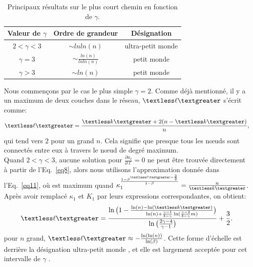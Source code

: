 \begin{table}[h]
\center
\begin{tabular}{|c|c|c|}
\hline
Valeur de $\gamma$ & Ordre de grandeur & Désignation \\
\hline
$2<\gamma<3$ & $\sim lnln(n)$& ultra-petit monde \cite{Cohen-Havlin2003,Do-al2003,Cohen-al2002,Chung-Lu2002,Fox-Bellwood2014,Hofstad-al2014}\\
\hline
$\gamma=3$ &$\sim \frac{ln(n)}{lnln(n)}$ & petit monde  \cite{Bollobas1985,Chung-Lu2002,Fronczak-al2004,Hofstad-al2004,Cohen-Havlin2009}\\
\hline
$\gamma>3$ &$\sim ln(n)$& petit monde \cite{Bollobas1985,Chung-Lu2002,Fronczak-al2004,Hofstad-al2004,Cohen-Havlin2009}\\
\hline
\end{tabular}
\caption{Principaux résultats sur le plus court chemin en fonction de $\gamma$.}
\label{tab1}
\end{table}
Nous commençons par le cas le plus simple $\gamma=2$. Comme déjà mentionné, il y a un maximum de deux couches dans le réseau, $\textless \ell \textgreater$  s'écrit comme:
   \begin{align}
   	\textless \ell \textgreater=\frac{\km+2(n-\km)}{n},
   	\label{eq14}  
   \end{align}
qui tend vers $2$ pour un grand $n$. Cela signifie que presque tous les nœuds sont connectés entre eux à travers le nœud de degré maximum. \\
Quand $ 2<\gamma<3 $, aucune solution pour $\frac{\partial n_{\ell}}{\partial\ell}=0$ ne peut être trouvée directement à partir de l'Eq.~\eqref{eq8}, alors nous utilisons l'approximation donnée dans l'Eq.~\eqref{eq11}, où \nl est maximum quand $\kappa_1^{\frac{1-\beta^{\textless \ell \textgreater-\frac{3}{2}}}{1-\beta}}=\frac{n}{\km}$. Après avoir remplacé $\kappa_1 $ et $K_1$ par leurs expressions correspondantes, on obtient:
\begin{align}
	\textless \ell \textgreater=\frac{\ln\big(1-\frac{\ln(n)-\ln(\km)}{\ln(n)+\frac{\gamma-1}{3-\gamma}\ln(\frac{\gamma-2}{3-\gamma}m)}\big)}{\ln\big(\frac{2\gamma-4}{\gamma-1}\big)}+\frac{3}{2}.
	\label{eq12}
\end{align}
pour $n$ grand, $\textless \ell \textgreater \approx -\frac{\ln(\ln(n))}{\ln(\beta)}$.
Cette forme d'échelle est derrière la désignation ultra-petit monde \cite{Cohen-Havlin2003}, et elle est largement acceptée pour cet intervalle de $\gamma $ \cite{Do-al2003,Cohen-al2002,Chung-Lu2002,Fox-Bellwood2014,Hofstad-al2014}.\\
